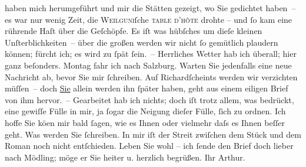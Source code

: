 \begin{ledgroupsized}[t]{13cm}
                    haben mich herumgeführt und \introOben{}mir\introOben{} die Stätten gezeigt, wo
                    Sie gedichtet haben – es war nur wenig Zeit, die \textsc{Weil{\pb}guni}ſche \textsc{table d’hôte} drohte – und ſo kam eine
                    rührende Haſt über die Geſchöpfe. Es iſt was hübſches um dieſe kleinen
                    Unſterblichkeiten – über die großen werden wir nicht ſo gemütlich plaudern
                    können; fürcht ich; es wird zu ſpät ſein. –\pend
           \pstart
           Herrliches Wetter hab ich überall; hier ganz beſonders. Montag fahr
                    ich nach Salzburg. Warten Sie {\pb}jedenfalls eine neue Nachricht ab, bevor Sie mir
                    ſchreiben. Auf Richardſcheints werden wir verzichten müſſen – doch
                        \uline{Sie}{ }\introOben{}allein\introOben{} werden ihn ſpäter haben, geht aus einem eiligen
                    Brief von ihm hervor. –\pend
           \pstart
           Gearbeitet hab ich nichts; doch iſt trotz allem, was bedrückt, eine gewiſſe Fülle
                    in mir, ja ſogar die Neigung dieſer Fülle, ſich zu {\pb}ordnen.\pend
           \pstart
           Ich hoffe Sie kö{\geminationn}en mir bald ſagen, wie es Ihnen
                        \introOben{}oder vielmehr\introOben{} daſs es Ihnen beſſer geht. Was werden
                    Sie ſchreiben. In mir iſt der Streit zwiſchen dem Stück und dem Roman noch nicht entſchieden.\pend
           \pstart
           Leben Sie wohl – ich ſende den Brief doch lieber nach Mödling; möge er Sie heiter u. herzlich begrüßen.\pend
           \pstart Ihr \spacefill\mbox{Arthur.}\pend{}
         
         \endnumbering{}\end{ledgroupsized}  \newcommand{\dateiname}{L00826}\newcommand{\titel}{Arthur Schnitzler an Hugo von Hofmannsthal, 23. 7. 1898}\newcommand{\editorInnen}{Martin Anton Müller und Gerd-Hermann Susen}
      